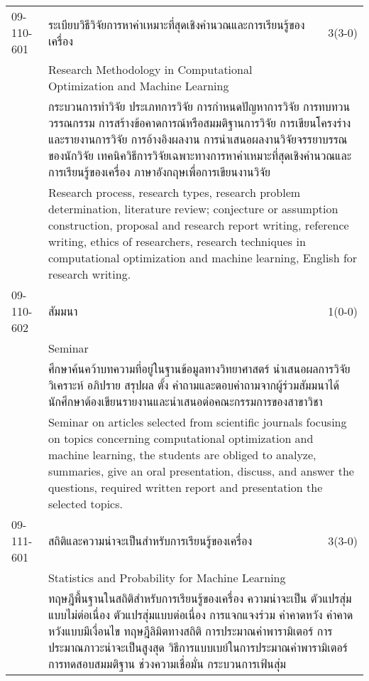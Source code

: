 \begin{longtable}{p{}p{}r{}}
09-110-601 & ระเบียบวิธีวิจัยการหาค่าเหมาะที่สุดเชิงคำนวณและการเรียนรู้ของเครื่อง & 3(3-0)\\*
 & Research Methodology in Computational Optimization and Machine Learning & \phantom{x} \vspace{3mm} \\*
&  \multicolumn{2}{p{0.75\textwidth}}{กระบวนการทำวิจัย ประเภทการวิจัย การกำหนดปัญหาการวิจัย การทบทวนวรรณกรรม การสร้างข้อคาดการณ์หรือสมมติฐานการวิจัย การเขียนโครงร่างและรายงานการวิจัย การอ้างอิงผลงาน การนำเสนอผลงานวิจัยจรรยาบรรณของนักวิจัย เทคนิควิธีการวิจัยเฉพาะทางการหาค่าเหมาะที่สุดเชิงคำนวณและการเรียนรู้ของเครื่อง ภาษาอังกฤษเพื่อการเขียนงานวิจัย } \vspace{3mm} \\*
&  \multicolumn{2}{p{0.75\textwidth}}{Research process, research types, research problem determination, literature review; conjecture or assumption construction, proposal and research report writing, reference writing, ethics of researchers, research techniques in computational optimization and machine learning, English for research writing.} \vspace{8mm} \\*
09-110-602 & สัมมนา & 1(0-0)\\*
 & Seminar & \phantom{x} \vspace{3mm} \\*
&  \multicolumn{2}{p{0.75\textwidth}}{ศึกษาค้นคว้าบทความที่อยู่ในฐานข้อมูลทางวิทยาศาสตร์ นำเสนอผลการวิจัย วิเคราะห์ อภิปราย สรุปผล ตั้ง คำถามและตอบคำถามจากผู้ร่วมสัมมนาได้ นักศึกษาต้องเขียนรายงานและนำเสนอต่อคณะกรรมการของสาขาวิชา} \vspace{3mm} \\*
&  \multicolumn{2}{p{0.75\textwidth}}{Seminar on articles selected from scientific journals focusing on topics concerning computational optimization and machine learning, the students are obliged to analyze, summaries, give an oral presentation, discuss, and answer the questions, required written report and presentation the selected topics.} \vspace{8mm} \\*
09-111-601 & สถิติและความน่าจะเป็นสำหรับการเรียนรู้ของเครื่อง & 3(3-0)\\*
 & Statistics and Probability for Machine Learning & \phantom{x} \vspace{3mm} \\*
&  \multicolumn{2}{p{0.75\textwidth}}{ทฤษฎีพื้นฐานในสถิติสำหรับการเรียนรู้ของเครื่อง ความน่าจะเป็น ตัวแปรสุ่มแบบไม่ต่อเนื่อง ตัวแปรสุ่มแบบต่อเนื่อง การแจกแจงร่วม ค่าคาดหวัง ค่าคาดหวังแบบมีเงื่อนไข ทฤษฎีลิมิตทางสถิติ การประมาณค่าพารามิเตอร์ การประมาณภาวะน่าจะเป็นสูงสุด วิธีการแบบเบย์ในการประมาณค่าพารามิเตอร์ การทดสอบสมมติฐาน ช่วงความเชื่อมั่น กระบวนการเฟ้นสุ่ม} \vspace{3mm} \\*

\end{longtable}
